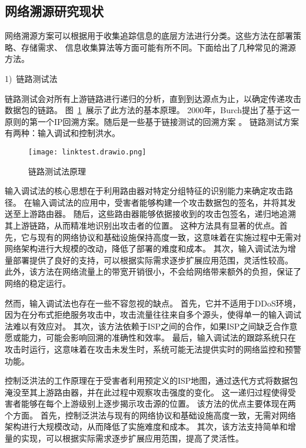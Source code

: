 \subsection{网络溯源研究现状}
网络溯源方案可以根据用于收集追踪信息的底层方法进行分类。这些方法在部署策略、存储需求、
信息收集算法等方面可能有所不同。下面给出了几种常见的溯源方法\cite{singh2016}。\par

1)~链路测试法\par
链路测试会对所有上游链路进行递归的分析，直到到达源点为止，以确定传递攻击数据包的链路。
图~\ref{fig:linktest}~展示了此方法的基本原理。
2000年，Burch提出了基于这一原则的第一个IP回溯方案\cite{Burch2000Tracing}。随后是一些基于链接测试的回溯方案
\cite{bhavani2020ip,hasan2023deep,
ThingSlomanDulay2008DDoSDetection}。
链路测试方案有两种：输入调试和控制洪水。
\begin{figure}[htbp]
  \centering
  \texttt{[image: linktest.drawio.png]}
  \caption{链路测试法原理}
  \label{fig:linktest}
\end{figure}

输入调试法的核心思想在于利用路由器对特定分组特征的识别能力来确定攻击路径。
在输入调试法的应用中，受害者能够构建一个攻击数据包的签名，并将其发送至上游路由器。
随后，这些路由器能够依据接收到的攻击包签名，递归地追溯其上游链路，从而精准地识别出攻击者的位置。
这种方法具有显著的优点。首先，它与现有的网络协议和基础设施保持高度一致，这意味着在实施过程中无需对网络架构进行大规模的改动，降低了部署的难度和成本。
其次，输入调试法为增量部署提供了良好的支持，可以根据实际需求逐步扩展应用范围，灵活性较高。
此外，该方法在网络流量上的带宽开销很小，不会给网络带来额外的负担，保证了网络的稳定运行。

然而，输入调试法也存在一些不容忽视的缺点。
首先，它并不适用于DDoS环境，因为在分布式拒绝服务攻击中，攻击流量往往来自多个源头，使得单一的输入调试法难以有效应对。
其次，该方法依赖于ISP之间的合作，如果ISP之间缺乏合作意愿或能力，可能会影响回溯的准确性和效率。
最后，输入调试法的跟踪系统只在攻击时运行，这意味着在攻击未发生时，系统可能无法提供实时的网络监控和预警功能。

控制泛洪法的工作原理在于受害者利用预定义的ISP地图，通过迭代方式将数据包淹没至其上游路由器，并在此过程中观察攻击强度的变化。
这一递归过程使得受害者能够在每个上游级别上逐步揭示攻击源的位置。
该方法的优点主要体现在两个方面。
首先，控制泛洪法与现有的网络协议和基础设施高度一致，无需对网络架构进行大规模改动，从而降低了实施难度和成本。
其次，该方法支持简单和增量的实现，可以根据实际需求逐步扩展应用范围，提高了灵活性。

